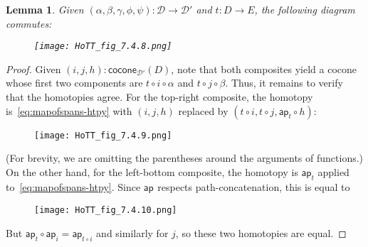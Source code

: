 \documentclass[12pt]{article}
\newcommand{\blank}{\mathord{\hspace{1pt}\text{--}\hspace{1pt}}}
\newcommand{\cocone}[2]{\mathsf{cocone}_{#1}(#2)}
\newcommand{\Ddiag}{\mathscr{D}}
\newcommand{\mapfunc}[1]{\ensuremath{\mathsf{ap}_{#1}}\xspace}
\newcounter{mathcount}
\newtheorem{prelem}{Lemma}
\newenvironment{lem}{\begin{prelem}}{\end{prelem}\addtocounter{mathcount}{1}}
\let\apfunc\mapfunc
\begin{document}
\begin{lem}\label{thm:conemap-funct}
  Given $(\alpha,\beta,\gamma,\phi,\psi):\Ddiag \to \Ddiag'$ and $t:D\to E$, the following diagram commutes:
\begin{figure}
 \centering
 \texttt{[image: HoTT\_fig\_7.4.8.png]}
\end{figure}
\end{lem}
\begin{proof}
  Given $(i,j,h):\cocone{\Ddiag'}{D}$, note that both composites yield a cocone whose first two components are $t\circ i\circ \alpha$ and $t\circ j\circ\beta$.
  Thus, it remains to verify that the homotopies agree.
  For the top-right composite, the homotopy is~\eqref{eq:mapofspans-htpy} with $(i,j,h)$ replaced by $(t\circ i, t\circ j, \apfunc{t}\circ h)$:
\begin{figure}
 \centering
 \texttt{[image: HoTT\_fig\_7.4.9.png]}
\end{figure}
  (For brevity, we are omitting the parentheses around the arguments of functions.)
  On the other hand, for the left-bottom composite, the homotopy is $\apfunc{t}$ applied to~\eqref{eq:mapofspans-htpy}.
  Since $\apfunc{}$ respects path-concatenation, this is equal to
\begin{figure}
 \centering
 \texttt{[image: HoTT\_fig\_7.4.10.png]}
\end{figure}
  But $\apfunc{t}\circ \apfunc{i} = \apfunc{t\circ i}$ and similarly for $j$, so these two homotopies are equal.
\end{proof}
\end{document}
